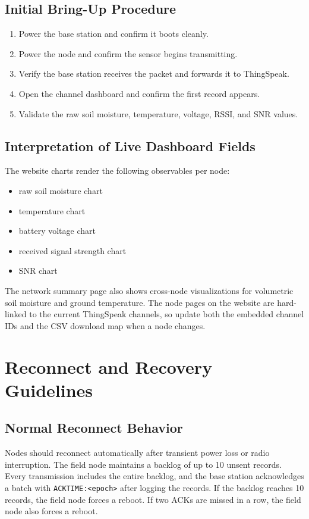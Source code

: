 \documentclass[11pt]{article}
\begin{document}
\subsection{Initial Bring-Up Procedure}
\begin{enumerate}
    \item Power the base station and confirm it boots cleanly.
    \item Power the node and confirm the sensor begins transmitting.
    \item Verify the base station receives the packet and forwards it to ThingSpeak.
    \item Open the channel dashboard and confirm the first record appears.
    \item Validate the raw soil moisture, temperature, voltage, RSSI, and SNR values.
\end{enumerate}

\subsection{Interpretation of Live Dashboard Fields}
The website charts render the following observables per node:
\begin{itemize}
    \item raw soil moisture chart
    \item temperature chart
    \item battery voltage chart
    \item received signal strength chart
    \item SNR chart
\end{itemize}

The network summary page also shows cross-node visualizations for volumetric soil moisture and ground temperature. The node pages on the website are hard-linked to the current ThingSpeak channels, so update both the embedded channel IDs and the CSV download map when a node changes.

\section{Reconnect and Recovery Guidelines}
\subsection{Normal Reconnect Behavior}
Nodes should reconnect automatically after transient power loss or radio interruption. The field node maintains a backlog of up to 10 unsent records. Every transmission includes the entire backlog, and the base station acknowledges a batch with \texttt{ACKTIME:<epoch>} after logging the records. If the backlog reaches 10 records, the field node forces a reboot. If two ACKs are missed in a row, the field node also forces a reboot.
\end{document}
